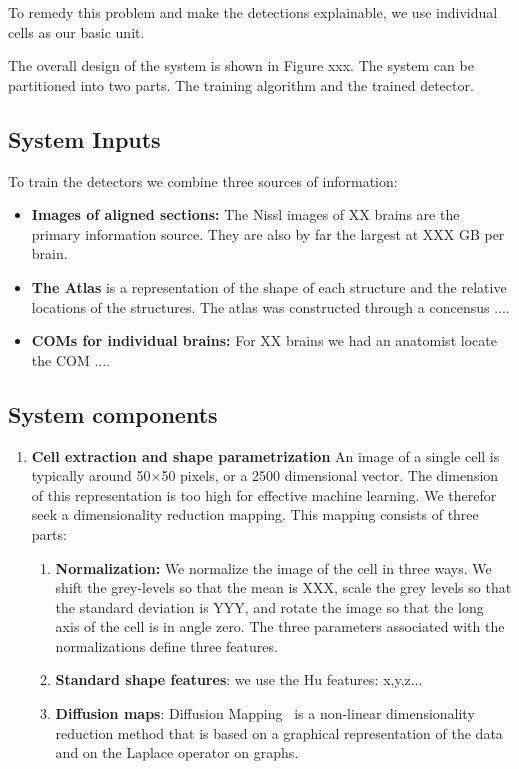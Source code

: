 \documentclass[runningheads]{llncs}
\begin{document}
To remedy this problem and make the detections explainable, we use individual cells as our basic unit. 

The overall design of the system is shown in Figure xxx. The system can be partitioned into two parts. The training algorithm and the trained detector.

\subsection{System Inputs}
To train the detectors we combine three sources of information:
\begin{itemize}
    \item {\bf Images of aligned sections:} The Nissl images of XX brains are the primary information source. They are also by far the largest at XXX GB per brain.
    \item {\bf The Atlas} is a representation of the shape of each structure and the relative locations of the structures. The atlas was constructed through a concensus ....
    \item {\bf COMs for individual brains:} For XX brains we had an anatomist locate the COM ....
\end{itemize}

\subsection{System components}

\begin{enumerate}
\item{\bf Cell extraction and shape parametrization}
An image of a single cell is typically around 50$\times$50 pixels, or a 2500 dimensional vector. The dimension of this representation is too high for effective machine learning. We therefor seek a dimensionality reduction mapping. This mapping consists of three parts:
\begin{enumerate}
    \item {\bf Normalization:} We normalize the image of the cell in three ways. We 
    shift the grey-levels so that the mean is XXX, scale the grey levels so that the standard deviation is YYY, and rotate the image so that the long axis of the cell is in angle zero. The three parameters associated with the normalizations define three features.
    \item {\bf Standard shape features}: we use the Hu features: x,y,z...
    \item{ \bf  Diffusion maps}: Diffusion Mapping~\cite{Belkin,
        Coifman} is a non-linear dimensionality reduction method that
      is based on a graphical representation of the data and on the
      Laplace operator on graphs.
      \end{enumerate}
\end{enumerate}
\end{document}

